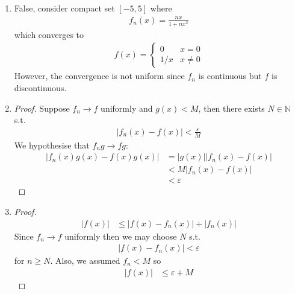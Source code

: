 \begin{enumerate}[label=(\alph*)]
    \item 
    False, consider compact set $[-5,5]$ where 
    \begin{align*}
        f_n(x) = \frac{nx}{1+nx^2}
    \end{align*}
    which converges to 
    \begin{align*}
        f(x) = \begin{cases}
            0 & x=0 \\
            1/x & x\neq 0
        \end{cases}
    \end{align*}
    However, the convergence is not uniform since $f_n$
    is continuous but $f$ is discontinuous.

    \item
    \begin{proof}
        Suppose $f_n \rightarrow f$ uniformly and 
        $g(x)<M$, then there exists 
        $N\in \mathbb{N}$ s.t. 
        \begin{align*}
            |f_n(x)-f(x)| < \frac{\varepsilon}{M}
        \end{align*}
        We hypothesise that $f_n g \rightarrow fg$:
        \begin{align*}
            |f_n(x)g(x)-f(x)g(x)| &= |g(x)| |f_n(x)-f(x)| \\
                                &< M |f_n(x)-f(x)| \\
                                &< \varepsilon
        \end{align*}
    \end{proof}

    \item
    \begin{proof}
        \begin{align*}
            |f(x)| &\leq |f(x)-f_n(x)| + |f_n(x)|
        \end{align*}
        Since $f_n \rightarrow f$ uniformly then we may choose 
        $N$ s.t.
        \begin{align*}
            |f(x)-f_n(x)| < \varepsilon
        \end{align*}
        for $n\geq N$. Also, we assumed $f_n < M$ so 
        \begin{align*}
            |f(x)| &\leq \varepsilon + M
        \end{align*}
    \end{proof}


\end{enumerate}
